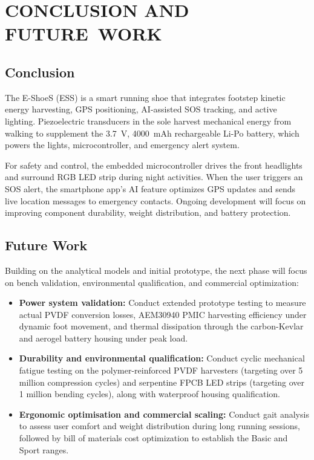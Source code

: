 \chapter{CONCLUSION AND FUTURE~WORK}
\section{Conclusion}
The E-ShoeS (ESS) is a smart running shoe that integrates footstep kinetic energy harvesting, GPS positioning, AI-assisted SOS tracking, and active lighting. Piezoelectric transducers in the sole harvest mechanical energy from walking to supplement the 3.7~V, 4000~mAh rechargeable Li-Po battery, which powers the lights, microcontroller, and emergency alert system.

For safety and control, the embedded microcontroller drives the front headlights and surround RGB LED strip during night activities. When the user triggers an SOS alert, the smartphone app's AI feature optimizes GPS updates and sends live location messages to emergency contacts. Ongoing development will focus on improving component durability, weight distribution, and battery protection.

\section{Future Work}
Building on the analytical models and initial prototype, the next phase will focus on bench validation, environmental qualification, and commercial optimization:
\begin{itemize}[label=--]
    \item \textbf{Power system validation:} Conduct extended prototype testing to measure actual PVDF conversion losses, AEM30940 PMIC harvesting efficiency under dynamic foot movement, and thermal dissipation through the carbon-Kevlar and aerogel battery housing under peak load.
    \item \textbf{Durability and environmental qualification:} Conduct cyclic mechanical fatigue testing on the polymer-reinforced PVDF harvesters (targeting over 5 million compression cycles) and serpentine FPCB LED strips (targeting over 1 million bending cycles), along with waterproof housing qualification.
    \item \textbf{Ergonomic optimisation and commercial scaling:} Conduct gait analysis to assess user comfort and weight distribution during long running sessions, followed by bill of materials cost optimization to establish the Basic and Sport ranges.
\end{itemize}